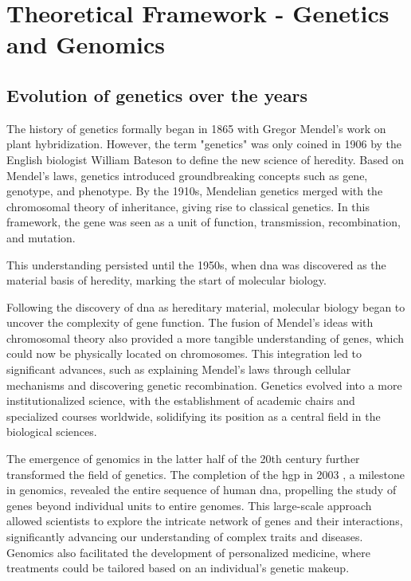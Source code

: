 \section{Theoretical Framework - Genetics and Genomics} \label{sec:intro_theoretical}
\subsection{Evolution of genetics over the years} \label{subsec:genetics_evolution}

The history of genetics formally began in 1865 with Gregor Mendel's work on plant hybridization. However, the term "genetics" was only coined in 1906 by the English biologist William Bateson to define the new science of heredity. Based on Mendel's laws, genetics introduced groundbreaking concepts such as gene, genotype, and phenotype. By the 1910s, Mendelian genetics merged with the chromosomal theory of inheritance, giving rise to classical genetics. In this framework, the gene was seen as a unit of function, transmission, recombination, and mutation. \cite{genetictimeline2}

This understanding persisted until the 1950s, when \ac{dna} was discovered as the material basis of heredity, marking the start of molecular biology. \cite{Gayon2016}

Following the discovery of \ac{dna} as hereditary material, molecular biology began to uncover the complexity of gene function. The fusion of Mendel's ideas with chromosomal theory also provided a more tangible understanding of genes, which could now be physically located on chromosomes. This integration led to significant advances, such as explaining Mendel's laws through cellular mechanisms and discovering genetic recombination. Genetics evolved into a more institutionalized science, with the establishment of academic chairs and specialized courses worldwide, solidifying its position as a central field in the biological sciences. \cite{Gayon2016}

The emergence of genomics in the latter half of the 20th century further transformed the field of genetics. The completion of the \ac{hgp} in 2003 \cite{Collins1995}, a milestone in genomics, revealed the entire sequence of human \ac{dna}, propelling the study of genes beyond individual units to entire genomes. This large-scale approach allowed scientists to explore the intricate network of genes and their interactions, significantly advancing our understanding of complex traits and diseases. Genomics also facilitated the development of personalized medicine, where treatments could be tailored based on an individual's genetic makeup. \cite{Gayon2016}

